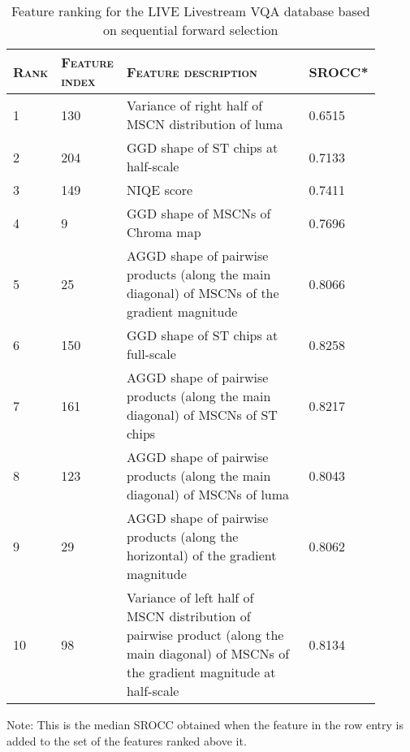 \documentclass[journal]{IEEEtran}
\begin{document}
\begin{table*}
\caption{Feature ranking for the LIVE Livestream VQA database based on sequential forward selection}
\begin{center}
\begin{threeparttable}
\begin{tabular}{|p{0.1\linewidth}|p{0.1\linewidth}|p{0.6\linewidth}|p{0.1\linewidth}|}
\hline
\textsc{Rank} & \textsc{Feature index} & \textsc{Feature description}  & SROCC* \\
\hline
1 & 130 & Variance of right half of MSCN distribution of luma & 0.6515 \\ 
\hline
2 & 204 & GGD shape of ST chips at half-scale  & 0.7133 \\ 
\hline
3 & 149 & NIQE score  & 0.7411 \\
\hline
4 & 9 & GGD shape of MSCNs of Chroma  map & 0.7696 \\ 
\hline
5 & 25 & AGGD shape of pairwise products (along the main diagonal) of MSCNs of the gradient magnitude  & 0.8066 \\
\hline
6 & 150 &  GGD shape of ST chips at full-scale  & 0.8258 \\
\hline
7 & 161 & AGGD shape of pairwise products (along the main diagonal) of MSCNs of ST chips  & 0.8217 \\
\hline
8 & 123 & AGGD shape of pairwise products (along the main diagonal) of MSCNs of luma & 0.8043 \\
\hline
9 & 29 & AGGD shape of pairwise products (along the horizontal) of the gradient magnitude & 0.8062 \\
\hline
10 & 98 &  Variance of left half of MSCN distribution of pairwise product (along  the main diagonal) of MSCNs of the gradient magnitude at half-scale & 0.8134 \\
\hline
\end{tabular}
    \begin{tablenotes}
      \small
      \item *Note: This is the median SROCC obtained when the feature in the row entry is added to the set of the features ranked above it.
    \end{tablenotes}
 \end{threeparttable}
 \end{center}
\label{tab:featurerank}
\vspace{-5mm}
\end{table*}
\end{document}
